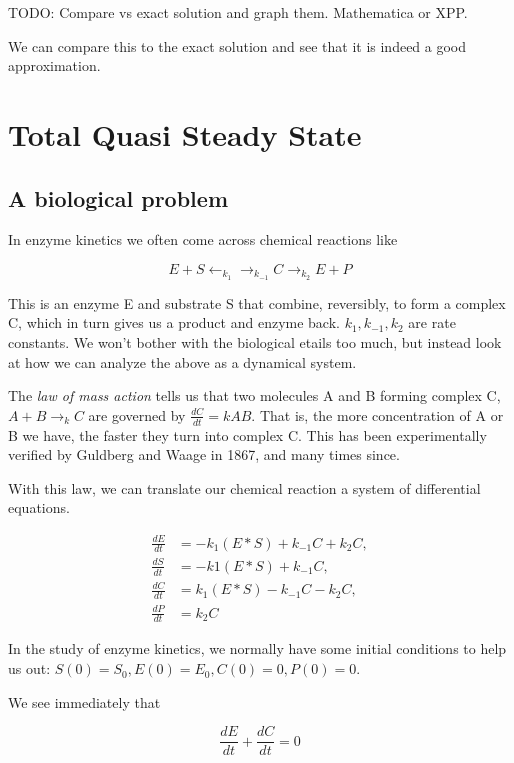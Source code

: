 \documentclass[12pt]{article}
\begin{document}
TODO: Compare vs exact solution and graph them. Mathematica or XPP.

We can compare this to the exact solution and see that it is indeed a good
approximation.

\section{Total Quasi Steady State}

\subsection{A biological problem}

In enzyme kinetics we often come across chemical reactions like

\begin{equation}
E + S \leftarrow_{k_1} \rightarrow_{k_{-1}} C \rightarrow_{k_2} E + P
\end{equation}

This is an enzyme E and substrate S that combine, reversibly, to form a complex
C, which in turn gives us a product and enzyme back. $k_1, k_{-1}, k_2$ are rate
constants. We won't bother with the biological etails too much, but instead look
at how we can analyze the above as a dynamical system.

The \textit{law of mass action} tells us that two molecules A and B forming
complex C, $A+B \rightarrow_k C$ are governed by $\frac{dC}{dt} = kAB$. That is,
the more concentration of A or B we have, the faster they turn into complex C.
This has been experimentally verified by Guldberg and Waage in 1867, and many
times since.

With this law, we can translate our chemical reaction a system of differential
equations.

\begin{align}
\frac{dE}{dt} &= -k_1(E*S) + k_{-1}C + k_2C, \\
\frac{dS}{dt} &= -k1(E*S) + k_{-1}C, \\
\frac{dC}{dt} &= k_1(E*S) - k_{-1}C - k_2C, \\
\frac{dP}{dt} &= k_2C
\end{align}

In the study of enzyme kinetics, we normally have some initial conditions to help
us out: $S(0) = S_0, E(0) = E_0, C(0)=0, P(0)=0$.

We see immediately that

\begin{equation}
\frac{dE}{dt} + \frac{dC}{dt} = 0
\end{equation}
\end{document}
